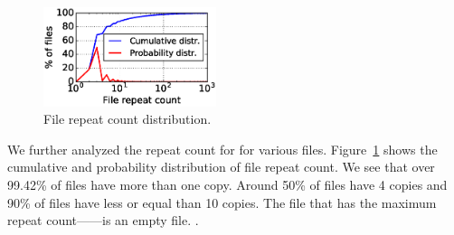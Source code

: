 %


\begin{figure} \centering
	\includegraphics[width=0.45\textwidth]{graphs/File_repeat_count.eps}
	\caption{File repeat count distribution.  } \label{fig:file-repeat-cnt}
\end{figure}

We further analyzed the repeat count for for various files.
%
Figure~\ref{fig:file-repeat-cnt} shows the cumulative and probability
distribution of file repeat count.  
%
We see that over 99.42\% of files have more than one copy.
%
Around 50\% of files have 4 copies and 90\% of files have less or equal than 10
copies. 
%
The file that has the maximum repeat count------is an empty file.
%
.
